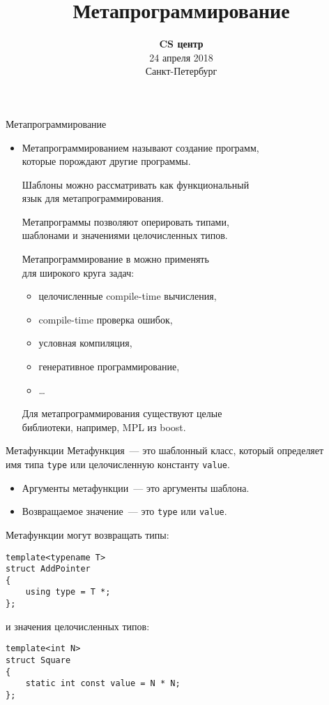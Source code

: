 \documentclass{beamer}
\title{Метапрограммирование}
\date{
   \textbf{CS центр}\\
   24 апреля 2018 \\
   Санкт-Петербург
}
\begin{document}
\begin{frame} 
  \titlepage
\end{frame}

\begin{frame}[fragile]{Метапрограммирование}
\begin{itemize}
    \item Метапрограммированием называют создание программ, \\которые порождают другие программы.
    
    \pitem Шаблоны \langcpp можно рассматривать как функциональный\\ язык
    для метапрограммирования.
    
    \pitem Метапрограммы \langcpp позволяют оперировать типами, \\шаблонами и значениями целочисленных типов.
    
    \pitem Метапрограммирование в \langcpp можно применять\\ для широкого круга задач:
    \begin{itemize}
        \item целочисленные compile-time вычисления,
        \item compile-time проверка ошибок,
        \item условная компиляция,
        \item генеративное программирование,
        \item \ldots
    \end{itemize}
    
    \pitem Для метапрограммирования существуют целые\\ библиотеки,
    например, MPL из boost.
\end{itemize}
\end{frame}

\begin{frame}[fragile]{Метафункции}
Метафункция~--- это шаблонный класс, 
который определяет \\имя типа \texttt{type} или целочисленную константу \texttt{value}.
\begin{itemize}
\item Аргументы метафункции~--- это аргументы шаблона.
\item Возвращаемое значение~--- это \texttt{type} или \texttt{value}.
\end{itemize}

Метафункции могут возвращать типы:
\begin{lstlisting}
template<typename T> 
struct AddPointer
{
    using type = T *; 
};
\end{lstlisting}
и значения целочисленных типов:
\begin{lstlisting}
template<int N> 
struct Square
{
    static int const value = N * N; 
};
\end{lstlisting}
\end{frame}
\end{document}
